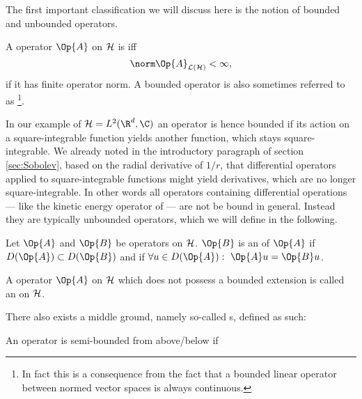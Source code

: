 The first important classification we will discuss here
is the notion of bounded and unbounded operators.
\begin{defn}
	\label{defn:OpBounded}
	A operator $\Op{A}$ on $\mathcal{H}$ is  iff
	\[ \opnorm{\Op{A}} < \infty, \]
	\ie if it has finite operator norm.
	A bounded operator is also sometimes referred to as %
	\footnote{In fact this is a consequence from the fact that a bounded linear operator
	between normed vector spaces is always continuous.}.
\end{defn}
In our example of $\hilbert = L^2(\R^d, \C)$ an operator is hence bounded
if its action on a square-integrable function yields another function,
which stays square-integrable.
We already noted in the introductory paragraph of section \vref{sec:Sobolev},
based on the radial derivative of $1/r$,
that differential operators applied to square-integrable functions
might yield derivatives, which are no longer square-integrable.
In other words all operators containing differential operations
--- like the kinetic energy operator of \QM ---
are not be bound in general.
Instead they are typically unbounded operators,
which we will define in the following.

\begin{defn}
	Let $\Op{A}$ and $\Op{B}$ be operators on $\mathcal{H}$.
	$\Op{B}$ is an  of $\Op{A}$ if
	\mbox{$D(\Op{A}) \subset D(\Op{B})$}
	and if $\forall u \in D(\Op{A}): \ \Op{A}u = \Op{B}u$.
\end{defn}

\begin{defn}
	A operator $\Op{A}$ on $\mathcal{H}$ which does not possess
	a bounded extension is called an  on $\mathcal{H}$.
\end{defn}

There also exists a middle ground,
namely so-called s, defined as such:
\begin{defn}
	An operator is semi-bounded from above/below if
\end{defn}


